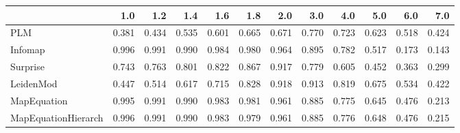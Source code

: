 \begin{tabular}{lrrrrrrrrrrr}
\toprule
{} &   1.0 &   1.2 &   1.4 &   1.6 &   1.8 &   2.0 &   3.0 &   4.0 &   5.0 &   6.0 &   7.0 \\
\midrule
PLM                 & 0.381 & 0.434 & 0.535 & 0.601 & 0.665 & 0.671 & 0.770 & 0.723 & 0.623 & 0.518 & 0.424 \\
Infomap             & 0.996 & 0.991 & 0.990 & 0.984 & 0.980 & 0.964 & 0.895 & 0.782 & 0.517 & 0.173 & 0.143 \\
Surprise            & 0.743 & 0.763 & 0.801 & 0.822 & 0.867 & 0.917 & 0.779 & 0.605 & 0.452 & 0.363 & 0.299 \\
LeidenMod           & 0.447 & 0.514 & 0.617 & 0.715 & 0.828 & 0.918 & 0.913 & 0.819 & 0.675 & 0.534 & 0.422 \\
MapEquation         & 0.995 & 0.991 & 0.990 & 0.983 & 0.981 & 0.961 & 0.885 & 0.775 & 0.645 & 0.476 & 0.213 \\
MapEquationHierarch & 0.996 & 0.991 & 0.990 & 0.983 & 0.979 & 0.961 & 0.885 & 0.776 & 0.648 & 0.476 & 0.215 \\
\bottomrule
\end{tabular}
